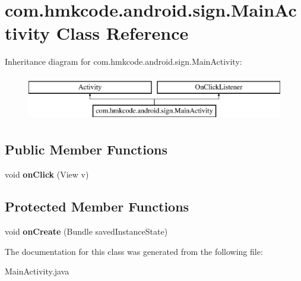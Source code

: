\hypertarget{classcom_1_1hmkcode_1_1android_1_1sign_1_1_main_activity}{\section{com.\+hmkcode.\+android.\+sign.\+Main\+Activity Class Reference}
\label{classcom_1_1hmkcode_1_1android_1_1sign_1_1_main_activity}
}
Inheritance diagram for com.\+hmkcode.\+android.\+sign.\+Main\+Activity\+:\begin{figure}[H]
\begin{center}
\leavevmode
\includegraphics[height=2.000000cm]{classcom_1_1hmkcode_1_1android_1_1sign_1_1_main_activity}
\end{center}
\end{figure}
\subsection*{Public Member Functions}
\begin{DoxyCompactItemize}
\item 
\hypertarget{classcom_1_1hmkcode_1_1android_1_1sign_1_1_main_activity_abcf7496c818023bb48e45fe5474092c2}{void {\bfseries on\+Click} (View v)}\label{classcom_1_1hmkcode_1_1android_1_1sign_1_1_main_activity_abcf7496c818023bb48e45fe5474092c2}

\end{DoxyCompactItemize}
\subsection*{Protected Member Functions}
\begin{DoxyCompactItemize}
\item 
\hypertarget{classcom_1_1hmkcode_1_1android_1_1sign_1_1_main_activity_a9f5e2236c0bd3cde22ec5961fbb5d21e}{void {\bfseries on\+Create} (Bundle saved\+Instance\+State)}\label{classcom_1_1hmkcode_1_1android_1_1sign_1_1_main_activity_a9f5e2236c0bd3cde22ec5961fbb5d21e}

\end{DoxyCompactItemize}


The documentation for this class was generated from the following file\+:\begin{DoxyCompactItemize}
\item 
Main\+Activity.\+java\end{DoxyCompactItemize}
